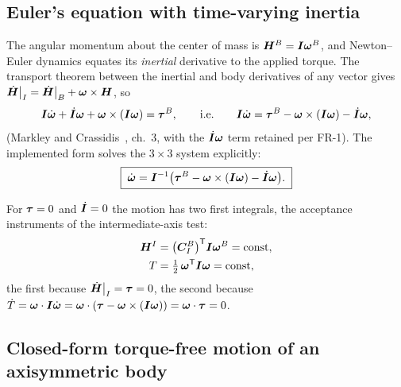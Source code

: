 \subsection{Euler's equation with time-varying inertia}

The angular momentum about the center of mass is $\bm{H}^{B} =
\bm{I}\bm{\omega}^{B}$, and Newton--Euler dynamics equates its
\emph{inertial} derivative to the applied torque. The transport theorem
between the inertial and body derivatives of any vector gives
$\dot{\bm{H}}\big|_{I} = \dot{\bm{H}}\big|_{B} + \bm{\omega} \times
\bm{H}$, so
\begin{equation}
  \bm{I}\dot{\bm{\omega}}
    + \dot{\bm{I}}\bm{\omega}
    + \bm{\omega} \times (\bm{I}\bm{\omega})
    = \bm{\tau}^{B} ,
  \qquad\text{i.e.}\qquad
  \bm{I}\dot{\bm{\omega}}
    = \bm{\tau}^{B}
      - \bm{\omega} \times (\bm{I}\bm{\omega})
      - \dot{\bm{I}}\bm{\omega} ,
  \label{eq:rigidbody:euler}
\end{equation}
(Markley and Crassidis~\cite{markley2014}, ch.~3, with the
$\dot{\bm{I}}\bm{\omega}$ term retained per FR-1). The implemented form
solves the $3 \times 3$ system explicitly:
\begin{equation}
  \boxed{\;
  \dot{\bm{\omega}}
    = \bm{I}^{-1}\bigl( \bm{\tau}^{B}
      - \bm{\omega} \times (\bm{I}\bm{\omega})
      - \dot{\bm{I}}\bm{\omega} \bigr) .
  \;}
  \label{eq:rigidbody:omegadot}
\end{equation}

For $\bm{\tau} = 0$ and $\dot{\bm{I}} = 0$ the motion has two first
integrals, the acceptance instruments of the intermediate-axis test:
\begin{align}
  \bm{H}^{I} &= \bigl(\bm{C}_{I}^{B}\bigr)^{\mathsf T} \bm{I}\bm{\omega}^{B}
    = \text{const}, \label{eq:rigidbody:H} \\
  T &= \tfrac{1}{2}\, \bm{\omega}^{\mathsf T} \bm{I} \bm{\omega}
    = \text{const}, \label{eq:rigidbody:T}
\end{align}
the first because $\dot{\bm{H}}\big|_{I} = \bm{\tau} = 0$, the second
because $\dot{T} = \bm{\omega} \cdot \bm{I}\dot{\bm{\omega}} =
\bm{\omega} \cdot (\bm{\tau} - \bm{\omega} \times (\bm{I}\bm{\omega})) =
\bm{\omega} \cdot \bm{\tau} = 0$.

\subsection{Closed-form torque-free motion of an axisymmetric body}
\label{sec:rigidbody:coning}

